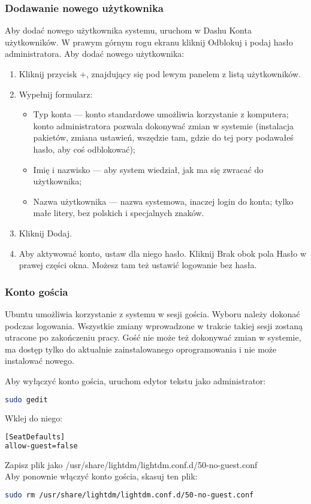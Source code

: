 \subsubsection{Dodawanie nowego użytkownika}
Aby dodać nowego użytkownika systemu, uruchom w Dashu \textcolor{ubuntu_orange}{Konta użytkowników}. W prawym górnym rogu ekranu kliknij \textcolor{ubuntu_orange}{Odblokuj} i podaj hasło administratora. Aby dodać nowego użytkownika:
\begin{enumerate}
\item Kliknij przycisk \textcolor{ubuntu_orange}{+}, znajdujący się pod lewym panelem z listą użytkowników.
\item Wypełnij formularz:
\begin{itemize}
\item \textcolor{ubuntu_orange}{Typ konta} --- konto standardowe umożliwia korzystanie z komputera; konto administratora pozwala dokonywać zmian w systemie (instalacja pakietów, zmiana ustawień, wszędzie tam, gdzie do tej pory podawałeś hasło, aby coś odblokować);
\item \textcolor{ubuntu_orange}{Imię i nazwisko} --- aby system wiedział, jak ma się zwracać do użytkownika;
\item \textcolor{ubuntu_orange}{Nazwa użytkownika} --- nazwa systemowa, inaczej login do konta; tylko małe litery, bez polskich i specjalnych znaków.
\end{itemize}
\item Kliknij \textcolor{ubuntu_orange}{Dodaj}.
\item Aby aktywować konto, ustaw dla niego hasło. Kliknij \textcolor{ubuntu_orange}{Brak} obok pola \textcolor{ubuntu_orange}{Hasło} w prawej części okna. Możesz tam też ustawić logowanie bez hasła.
\end{enumerate}

\subsubsection{Konto gościa}
Ubuntu umożliwia korzystanie z systemu w sesji gościa. Wyboru należy dokonać podczas logowania. Wszystkie zmiany wprowadzone w trakcie takiej sesji zostaną utracone po zakończeniu pracy. Gość nie może też dokonywać zmian w systemie, ma dostęp tylko do aktualnie zainstalowanego oprogramowania i nie może instalować nowego.

Aby wyłączyć konto gościa, uruchom edytor tekstu jako administrator:
\begin{lstlisting}[language=bash]
sudo gedit
\end{lstlisting}

Wklej do niego:

\begin{lstlisting}[language=bash]
[SeatDefaults]
allow-guest=false
\end{lstlisting}

Zapisz plik jako /usr/share/lightdm/lightdm.conf.d/50-no-guest.conf\\
Aby ponownie włączyć konto gościa, skasuj ten plik:

\begin{lstlisting}[language=bash]
sudo rm /usr/share/lightdm/lightdm.conf.d/50-no-guest.conf
\end{lstlisting}
\clearpage